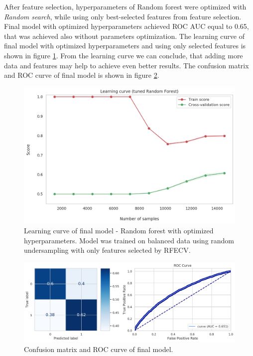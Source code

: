 \documentclass[runningheads]{llncs}
\begin{document}
After feature selection, hyperparameters of Random forest were optimized with \textit{Random search}, while using only best-selected features from feature selection. Final model with optimized hyperparameters achieved ROC AUC equal to 0.65, that was achieved also without parameters optimization. The learning curve of final model with optimized hyperparameters and using only selected features is shown in figure \ref{fig:learning-curve}. From the learning curve we can conclude, that adding more data and features may help to achieve even better results. The confusion matrix and ROC curve of final model is shown in figure \ref{fig:final-model-results}.

\begin{figure}[h]
    \centering
    \includegraphics[width=0.9\linewidth]{figures/learning_curve.png}
    \caption{Learning curve of final model - Random forest with optimized hyperparameters. Model was trained on balanced data using random undersampling with only features selected by RFECV.}
    \label{fig:learning-curve}
\end{figure}

\begin{figure}[h!]
    \centering
    \includegraphics[width=\linewidth]{figures/final_model.png}
    \caption{Confusion matrix and ROC curve of final model.}
    \label{fig:final-model-results}
\end{figure}
\end{document}
